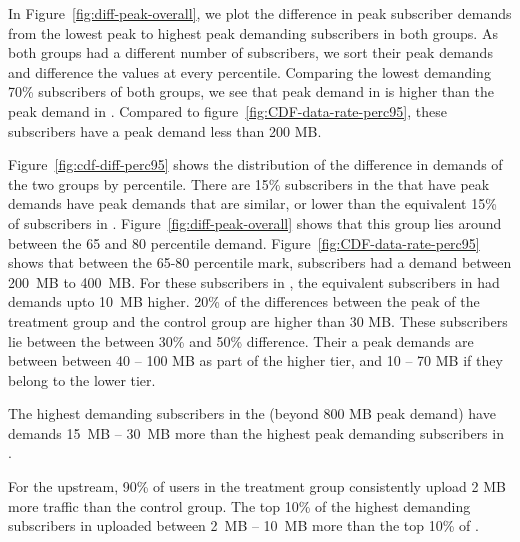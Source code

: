 In Figure~\ref{fig:diff-peak-overall}, we plot the difference in
peak subscriber demands from the 
lowest peak to highest peak demanding subscribers in both groups.
As both groups had a different number of subscribers, we sort their peak demands
and difference the values at every percentile.
Comparing the lowest demanding 70\% subscribers of both groups, we
see that peak demand in \treatment{} is higher than the peak demand in \control{}.
Compared to figure~\ref{fig:CDF-data-rate-perc95}, these subscribers have a peak 
demand less than 200 MB.


Figure~\ref{fig:cdf-diff-perc95} shows the distribution of the difference in demands of the two
groups by percentile. There are 15\% subscribers in the \treatment{} 
that have peak demands have peak demands that are similar, or lower than the
equivalent 15\% of subscribers in \control{}. Figure~\ref{fig:diff-peak-overall} shows
that this group lies around between the 65 and 80 percentile demand. Figure~\ref{fig:CDF-data-rate-perc95}
shows that between the 65-80 percentile mark, subscribers had a demand between 
200~MB to 400~MB. For these subscribers in \treatment{}, the equivalent subscribers
in \control{} had demands upto 10~MB higher. 20\% of the differences between the peak
of the treatment group and the control group are higher than 30 MB. These subscribers
lie between the between 30\% and 50\% difference. Their a peak demands are between
between 40 -- 100 MB as part of the higher tier, and 10 -- 70 MB if they belong to
the lower tier.


The highest demanding subscribers in the \treatment{} (beyond 800 MB peak demand)
have demands 15~MB -- 30~MB more than the highest peak demanding subscribers
in \control{}.

For the upstream, 90\% of users in the treatment group consistently upload 2 MB
more traffic than the control group. The top 10\% of the highest demanding subscribers
in \treatment{} uploaded between 2~MB -- 10~MB more than the top 10\% of \control{}.



